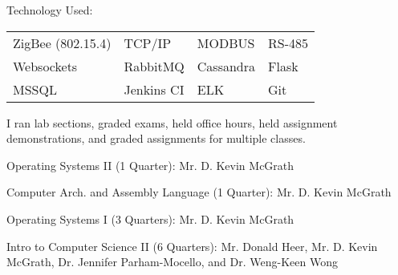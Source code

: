 \documentclass[letterpaper]{deedy-resume} %
\begin{document}
\begin{minipage}[t]{0.66\textwidth}
Technology Used:\\
\begin{tabular}{llll}
ZigBee (802.15.4) & TCP/IP & MODBUS & RS-485\\
Websockets & RabbitMQ & Cassandra & Flask\\
MSSQL & Jenkins CI & ELK & Git\\
\end{tabular}

\sectionspace %



I ran lab sections, graded exams, held office hours, held assignment demonstrations, and graded assignments for multiple classes.
\vspace{\topsep} %
\begin{tightitemize}
\item Operating Systems II (1 Quarter): Mr. D. Kevin McGrath
\item Computer Arch. and Assembly Language (1 Quarter): Mr. D. Kevin McGrath
\item Operating Systems I (3 Quarters): Mr. D. Kevin McGrath
\item Intro to Computer Science II (6 Quarters): Mr. Donald Heer, Mr. D. Kevin McGrath, Dr. Jennifer Parham-Mocello, and  Dr. Weng-Keen Wong
\end{tightitemize}

\sectionspace %







\end{minipage}
\end{document}
